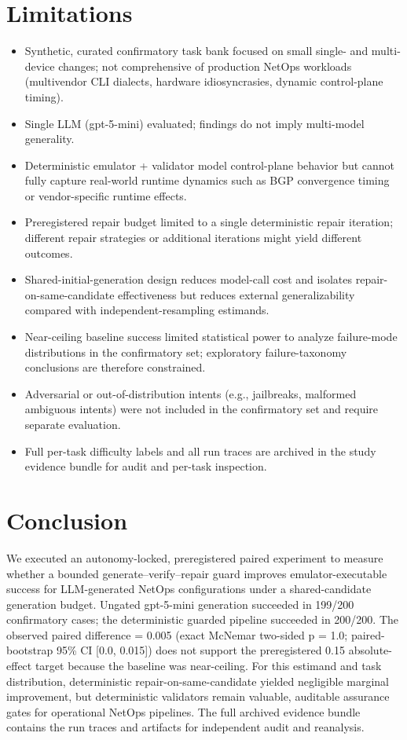\documentclass[conference]{IEEEtran}
\begin{document}
\section{Limitations}
\begin{itemize}
\item Synthetic, curated confirmatory task bank focused on small single- and multi-device changes; not comprehensive of production NetOps workloads (multivendor CLI dialects, hardware idiosyncrasies, dynamic control-plane timing).
\item Single LLM (gpt-5-mini) evaluated; findings do not imply multi-model generality.
\item Deterministic emulator + validator model control-plane behavior but cannot fully capture real-world runtime dynamics such as BGP convergence timing or vendor-specific runtime effects.
\item Preregistered repair budget limited to a single deterministic repair iteration; different repair strategies or additional iterations might yield different outcomes.
\item Shared-initial-generation design reduces model-call cost and isolates repair-on-same-candidate effectiveness but reduces external generalizability compared with independent-resampling estimands.
\item Near-ceiling baseline success limited statistical power to analyze failure-mode distributions in the confirmatory set; exploratory failure-taxonomy conclusions are therefore constrained.
\item Adversarial or out-of-distribution intents (e.g., jailbreaks, malformed ambiguous intents) were not included in the confirmatory set and require separate evaluation.
\item Full per-task difficulty labels and all run traces are archived in the study evidence bundle for audit and per-task inspection.
\end{itemize}

\section{Conclusion}
We executed an autonomy-locked, preregistered paired experiment to measure whether a bounded generate--verify--repair guard improves emulator-executable success for LLM-generated NetOps configurations under a shared-candidate generation budget. Ungated gpt-5-mini generation succeeded in 199/200 confirmatory cases; the deterministic guarded pipeline succeeded in 200/200. The observed paired difference = 0.005 (exact McNemar two-sided p = 1.0; paired-bootstrap 95\% CI [0.0, 0.015]) does not support the preregistered 0.15 absolute-effect target because the baseline was near-ceiling. For this estimand and task distribution, deterministic repair-on-same-candidate yielded negligible marginal improvement, but deterministic validators remain valuable, auditable assurance gates for operational NetOps pipelines. The full archived evidence bundle contains the run traces and artifacts for independent audit and reanalysis.
\end{document}
